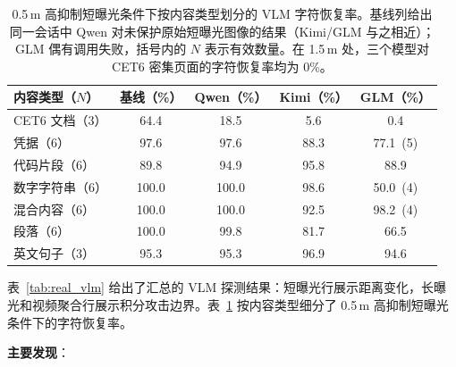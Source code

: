 \documentclass{ieeeaccess}
\begin{document}
\begin{table}[!t]
\caption{0.5\,m 高抑制短曝光条件下按内容类型划分的 VLM 字符恢复率。基线列给出同一会话中 Qwen 对未保护原始短曝光图像的结果（Kimi/GLM 与之相近）；GLM 偶有调用失败，括号内的 $N$ 表示有效数量。在 1.5\,m 处，三个模型对 CET6 密集页面的字符恢复率均为 0\%。}
\label{tab:vlm_content}
\centering
\footnotesize
\setlength{\tabcolsep}{2.8pt}
\begin{tabular}{lcccc}
\toprule
内容类型（$N$） & 基线（\%） & Qwen（\%） & Kimi（\%） & GLM（\%） \\
\midrule
CET6 文档（3） & 64.4 & 18.5 & 5.6 & 0.4 \\
凭据（6） & 97.6 & 97.6 & 88.3 & 77.1~(5) \\
代码片段（6） & 89.8 & 94.9 & 95.8 & 88.9 \\
数字字符串（6） & 100.0 & 100.0 & 98.6 & 50.0~(4) \\
混合内容（6） & 100.0 & 100.0 & 92.5 & 98.2~(4) \\
段落（6） & 100.0 & 99.8 & 81.7 & 66.5 \\
英文句子（3） & 95.3 & 95.3 & 96.9 & 94.6 \\
\bottomrule
\end{tabular}
\end{table}

表~\ref{tab:real_vlm} 给出了汇总的 VLM 探测结果：短曝光行展示距离变化，长曝光和视频聚合行展示积分攻击边界。表~\ref{tab:vlm_content} 按内容类型细分了 0.5\,m 高抑制短曝光条件下的字符恢复率。

\textbf{主要发现}：
\end{document}
